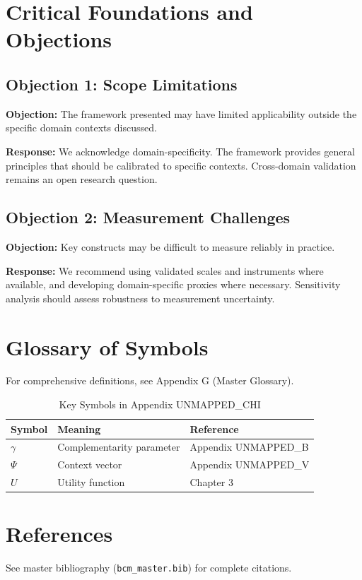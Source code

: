 \documentclass[11pt]{article}
\begin{document}

\section{Critical Foundations and Objections}
\label{sec:chi-foundations}

\subsection{Objection 1: Scope Limitations}

\textbf{Objection:} The framework presented may have limited applicability
outside the specific domain contexts discussed.

\textbf{Response:} We acknowledge domain-specificity. The framework provides
general principles that should be calibrated to specific contexts. Cross-domain
validation remains an open research question.

\subsection{Objection 2: Measurement Challenges}

\textbf{Objection:} Key constructs may be difficult to measure reliably in
practice.

\textbf{Response:} We recommend using validated scales and instruments where
available, and developing domain-specific proxies where necessary. Sensitivity
analysis should assess robustness to measurement uncertainty.



\section{Glossary of Symbols}
\label{sec:chi-glossary}

For comprehensive definitions, see Appendix G (Master Glossary).

\begin{table}[htbp]
\centering
\caption{Key Symbols in Appendix UNMAPPED_CHI}
\begin{tabular}{lll}
\toprule
\textbf{Symbol} & \textbf{Meaning} & \textbf{Reference} \\
\midrule
$\gamma$ & Complementarity parameter & Appendix UNMAPPED_B \\
$\Psi$ & Context vector & Appendix UNMAPPED_V \\
$U$ & Utility function & Chapter 3 \\
\bottomrule
\end{tabular}
\end{table}


\section{References}
\label{sec:references}

See master bibliography (\texttt{bcm\_master.bib}) for complete citations.

\nocite{bcm_master}
\end{document}
